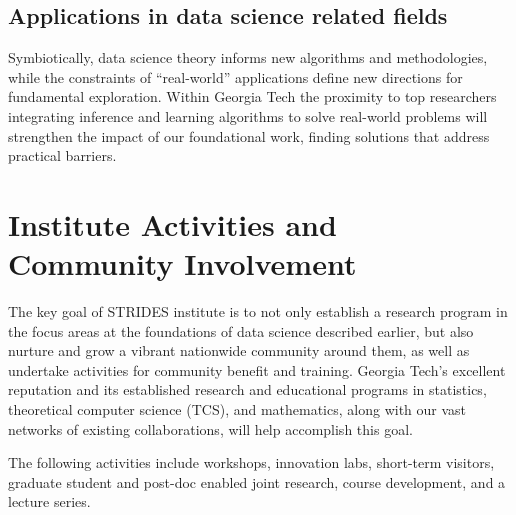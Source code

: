 \documentclass[12pt]{article}
\begin{document}
\vspace*{-1em}
\subsection{Applications in data science related fields}
\label{sec:applications}

Symbiotically, data science theory informs new algorithms and methodologies, while the constraints of ``real-world'' applications  define new directions for fundamental exploration.
Within Georgia Tech the proximity to top researchers integrating inference and learning algorithms to solve real-world problems will  strengthen the impact of our foundational work, finding solutions that address practical barriers.



\vspace*{-1em}


\section{Institute Activities and Community Involvement}
The key goal of STRIDES institute is to not only establish a research program in the focus
areas at the foundations of data science described earlier, but also nurture and grow a
vibrant nationwide community around them, as well as undertake activities for community
benefit and training. Georgia Tech's excellent reputation and its established research and
educational programs in statistics, theoretical computer science (TCS), and mathematics,
along with our vast networks of existing collaborations, will help accomplish this goal.


The following activities include workshops,
innovation labs,
short-term visitors,
graduate student and post-doc enabled joint research,
course development, and
a lecture series.



\vspace*{-1em}
\end{document}
